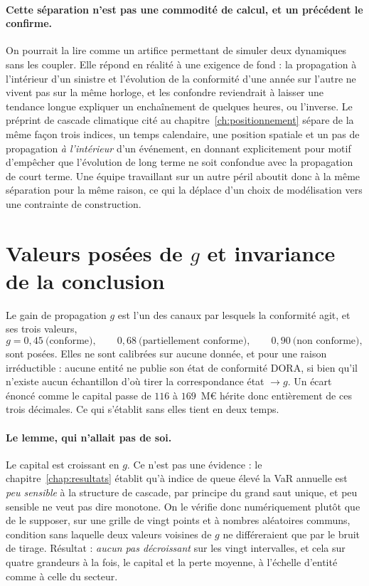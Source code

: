 \paragraph{Cette séparation n'est pas une commodité de calcul, et un précédent le confirme.} On
pourrait la lire comme un artifice permettant de simuler deux dynamiques sans les coupler. Elle
répond en réalité à une exigence de fond : la propagation à l'intérieur d'un sinistre et
l'évolution de la conformité d'une année sur l'autre ne vivent pas sur la même horloge, et les
confondre reviendrait à laisser une tendance longue expliquer un enchaînement de quelques
heures, ou l'inverse. Le préprint de cascade climatique cité au chapitre~\ref{ch:positionnement}
\citep{ccrn2026} sépare de la même façon trois indices, un temps calendaire, une position
spatiale et un pas de propagation \emph{à l'intérieur} d'un événement, en donnant explicitement
pour motif d'empêcher que l'évolution de long terme ne soit confondue avec la propagation de
court terme. Une équipe travaillant sur un autre péril aboutit donc à la même séparation pour la
même raison, ce qui la déplace d'un choix de modélisation vers une contrainte de construction.

\section{Valeurs posées de \texorpdfstring{$g$}{g} et invariance de la conclusion}

Le gain de propagation $g$ est l'un des canaux par lesquels la conformité agit, et ses trois
valeurs,
\[
  g = 0{,}45 \ \text{(conforme)}, \qquad 0{,}68 \ \text{(partiellement conforme)},
  \qquad 0{,}90 \ \text{(non conforme)},
\]
sont posées. Elles ne sont calibrées sur aucune donnée, et pour une raison
irréductible : aucune entité ne publie son état de conformité DORA, si bien qu'il
n'existe aucun échantillon d'où tirer la correspondance état $\to g$. Un écart énoncé comme
\og le capital passe de $116$ à $169$~M\euro\fg{} hérite donc entièrement de ces trois décimales.
Ce qui s'établit sans elles tient en deux temps.

\paragraph{Le lemme, qui n'allait pas de soi.} Le capital est croissant en $g$. Ce
n'est pas une évidence : le chapitre~\ref{chap:resultats} établit qu'à indice de queue élevé la
VaR annuelle est \emph{peu sensible} à la structure de cascade, par principe du grand
saut unique, et peu sensible ne veut pas dire monotone. On le vérifie donc numériquement plutôt
que de le supposer, sur une grille de vingt points et à nombres aléatoires communs, condition
sans laquelle deux valeurs voisines de $g$ ne différeraient que par le bruit de tirage. Résultat :
\emph{aucun pas décroissant} sur les vingt intervalles, et cela sur quatre grandeurs à la fois,
le capital et la perte moyenne, à l'échelle d'entité comme à celle du secteur.

